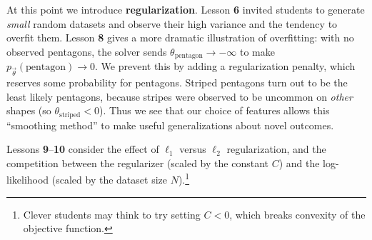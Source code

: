 \documentclass[11pt,letterpaper]{article}
\newcommand{\les}[1]{\textbf{#1}}
\begin{document}
At this point we introduce \textbf{regularization}.  Lesson \les{6}
invited students to generate {\em small} random datasets and observe
their high variance and the tendency to overfit them.  Lesson
\les{8} gives a more dramatic illustration of overfitting: with no
observed pentagons, the solver sends $\theta_{\textrm{pentagon}}
\rightarrow -\infty$ to make $p_{\vec{\theta}}(\textrm{pentagon})
\rightarrow 0$.  We prevent this by adding a regularization penalty,
which reserves some probability for pentagons.  Striped pentagons turn out
to be the least likely pentagons, because stripes were observed to be
uncommon on {\em other} shapes (so $\theta_{\textrm{striped}} < 0$).
Thus we see that our choice of features allows this ``smoothing
method'' to make useful generalizations about novel outcomes.

 


Lessons \les{9}--\les{10} consider the effect of $\ell_1$ versus
$\ell_2$ regularization, and the competition between the regularizer
(scaled by the constant $C$) and the log-likelihood (scaled by the
dataset size $N$).\footnote{Clever students may think to try setting
  $C < 0$, which breaks convexity of the objective function.}

\end{document}

